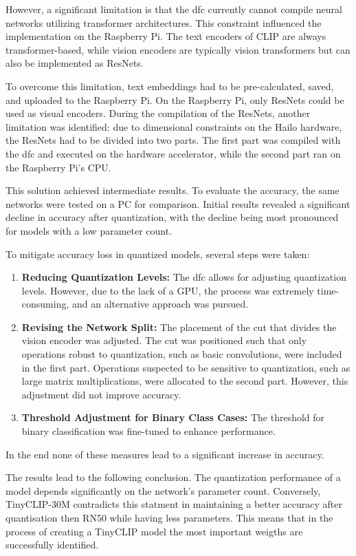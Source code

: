 However, a significant limitation is that the \acrshort{dfc} currently cannot compile neural networks utilizing transformer architectures.  
This constraint influenced the implementation on the Raspberry Pi.  
The text encoders of CLIP are always transformer-based, while vision encoders are typically vision transformers but can also be implemented as ResNets.  

To overcome this limitation, text embeddings had to be pre-calculated, saved, and uploaded to the Raspberry Pi.  
On the Raspberry Pi, only ResNets could be used as visual encoders.  
During the compilation of the ResNets, another limitation was identified: due to dimensional constraints on the Hailo hardware, the ResNets had to be divided into two parts.  
The first part was compiled with the \acrshort{dfc} and executed on the hardware accelerator, while the second part ran on the Raspberry Pi's CPU.  

This solution achieved intermediate results.  
To evaluate the accuracy, the same networks were tested on a PC for comparison.  
Initial results revealed a significant decline in accuracy after quantization, with the decline being most pronounced for models with a low parameter count.  

To mitigate accuracy loss in quantized models, several steps were taken:  
\begin{enumerate}  
    \item \textbf{Reducing Quantization Levels:} The \acrshort{dfc} allows for adjusting quantization levels.  
    However, due to the lack of a GPU, the process was extremely time-consuming, and an alternative approach was pursued.  
    \item \textbf{Revising the Network Split:} The placement of the cut that divides the vision encoder was adjusted.  
    The cut was positioned such that only operations robust to quantization, such as basic convolutions, were included in the first part.  
    Operations suspected to be sensitive to quantization, such as large matrix multiplications, were allocated to the second part.  
    However, this adjustment did not improve accuracy.  
    \item \textbf{Threshold Adjustment for Binary Class Cases:} The threshold for binary classification was fine-tuned to enhance performance.  
\end{enumerate}  
In the end none of these measures lead to a significant increase in accuracy.

The results lead to the following conclusion.
The quantization performance of a model depends significantly on the network's parameter count. 
Conversely, TinyCLIP-30M contradicts this statment in maintaining a better accuracy after quantisation then RN50 while having less parameters.  
This means that in the process of creating a TinyCLIP model the most important weigths are successfully identified.



